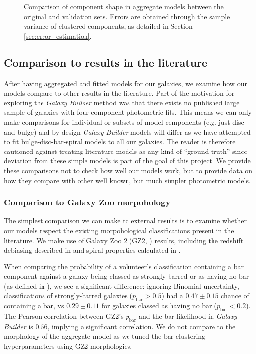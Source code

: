 \documentclass[../main.tex]{subfiles}
\begin{document}
\begin{figure*}
  \caption{Comparison of component shape in aggregate models between the original and validation sets. Errors are obtained through the sample variance of clustered components, as detailed in Section \ref{sec:error_estimation}.}
  \label{fig:aggregate_model_consistency}
\end{figure*}

\subsection{Comparison to results in the literature}

After having aggregated and fitted models for our galaxies, we examine how our models compare to other results in the literature. Part of the motivation for exploring the \textit{Galaxy Builder} method was that there exists no published large sample of galaxies with four-component photometric fits. This means we can only make comparisons for individual or subsets of model components (e.g. just disc and bulge) and by design \textit{Galaxy Builder} models will differ as we have attempted to fit bulge-disc-bar-spiral models to all our galaxies. The reader is therefore cautioned against treating literature models as any kind of ``ground truth'' since deviation from these simple models is part of the goal of this project. We provide these comparisons not to check how well our models work, but to provide data on how they compare with other well known, but much simpler photometric models.

\subsubsection{Comparison to Galaxy Zoo morpohology}

The simplest comparison we can make to external results is to examine whether our models respect the existing morpohological classifications present in the literature. We make use of Galaxy Zoo 2 (GZ2, \citealt{Willett2013:1308.3496v2}) results, including the redshift debiasing described in \citet{Hart2016:1607.01019v1} and spiral properties calculated in \citet{Hart2016:1607.01019v1}.

When comparing the probability of a volunteer's classification containing a bar component against a galaxy being classed as strongly-barred or as having no bar (as defined in \citealt{Masters2010:1003.0449v2}), we see a significant difference: ignoring Binomial uncertainty, classifications of strongly-barred galaxies ($p_\text{bar} > 0.5$) had a $0.47 \pm 0.15$ chance of containing a bar, vs $0.29 \pm 0.11$ for galaxies classed as having no bar ($p_\text{bar} < 0.2$). The Pearson correlation between GZ2's $p_\text{bar}$ and the bar likelihood in \textit{Galaxy Builder} is $0.56$, implying a significant correlation. We do not compare to the morphology of the aggregate model as we tuned the bar clustering hyperparameters using GZ2 morphologies.
\end{document}
